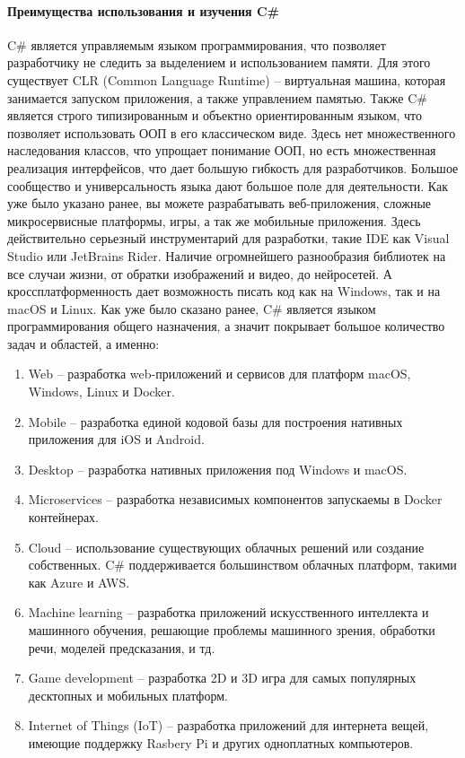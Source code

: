 \paragraph{Преимущества использования и изучения C\#}

C\# является управляемым языком программирования, что позволяет разработчику не следить за выделением и использованием памяти. Для этого существует CLR (Common Language Runtime) – виртуальная машина, которая занимается запуском приложения, а также управлением памятью.
Также C\# является строго типизированным и объектно ориентированным языком, что позволяет использовать ООП в его классическом виде. Здесь нет множественного наследования классов, что упрощает понимание ООП, но есть множественная реализация интерфейсов, что дает большую гибкость для разработчиков.
Большое сообщество и универсальность языка дают большое поле для деятельности. Как уже было указано ранее, вы можете разрабатывать веб-приложения, сложные микросервисные платформы, игры, а так же мобильные приложения. Здесь действительно серьезный инструментарий для разработки, такие IDE как Visual Studio или JetBrains Rider. Наличие огромнейшего разнообразия библиотек на все случаи жизни, от обратки изображений и видео, до нейросетей. А кроссплатформенность дает возможность писать код как на Windows, так и на macOS и Linux.
Как уже было сказано ранее, C\# является языком программирования общего назначения, а значит покрывает большое количество задач и областей, а именно:
\begin{enumerate}
	\item Web – разработка web-приложений и сервисов для платформ macOS, Windows, Linux и Docker.
	\item Mobile – разработка единой кодовой базы для построения нативных приложения для iOS и Android.
	\item Desktop – разработка нативных приложения под Windows и macOS.
	\item Microservices – разработка независимых компонентов запускаемы в Docker контейнерах.
	\item Cloud – использование существующих облачных решений или создание собственных. C\# поддерживается большинством облачных платформ, такими как Azure и AWS.
	\item Machine learning – разработка приложений искусственного интеллекта и машинного обучения, решающие проблемы машинного зрения, обработки речи, моделей предсказания, и тд.
	\item Game development – разработка 2D и 3D игра для самых популярных десктопных и мобильных платформ.
	\item Internet of Things (IoT) – разработка приложений для интернета вещей, имеющие поддержку Rasbery Pi и других одноплатных компьютеров.
\end{enumerate}


